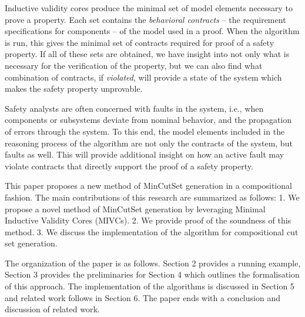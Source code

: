 Inductive validity cores produce the minimal set of model elements necessary to prove a property. Each set contains the \emph{behavioral contracts} -- the requirement specifications for components -- of the model used in a proof. When the \aivcalg algorithm is run, this gives the minimal set of contracts required for proof of a safety property. If all of these sets are obtained, we have insight into not only what is necessary for the verification of the property, but we can also find what combination of contracts, if \emph{violated}, will provide a state of the system which makes the safety property unprovable. 

Safety analysts are often concerned with faults in the system, i.e., when components or subsystems deviate from nominal behavior, and the propagation of errors through the system. To this end, the model elements included in the reasoning process of the \aivcalg algorithm are not only the contracts of the system, but faults as well. This will provide additional insight on how an active fault may violate contracts that directly support the proof of a safety property. 

This paper proposes a new method of MinCutSet generation in a compositional fashion. The main contributions of this research are summarized as follows: 1. We propose a novel method of MinCutSet generation by leveraging Minimal Inductive Validity Cores (MIVCs). %
2. We provide proof of the soundness of this method. 3. We discuss the implementation of the algorithm for compositional cut set generation.

The organization of the paper is as follows.  Section 2 provides a running example, Section 3 provides the preliminaries for Section 4 which outlines the formalisation of this approach. The implementation of the algorithms is discussed in Section 5 and related work follows in Section 6. The paper ends with a conclusion and discussion of related work.

